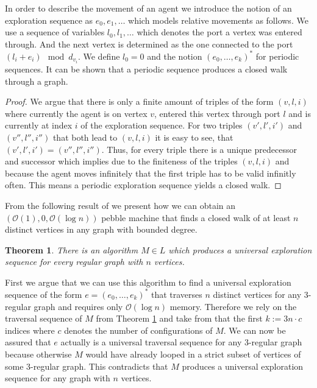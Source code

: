 \documentclass[draft,oneside]{scrartcl}
\newtheorem{thm}{Theorem}
\begin{document}
In order to describe the movement of an agent we introduce the notion of an
exploration sequence as $e_{0}, e_{1},\dots$ which models relative movements
as follows. We use a sequence of variables $l_{0},l_{1},\dots$ which denotes
the port a vertex was entered through. And the next vertex is determined as the
one connected to the port $(l_{i} + e_{i}) \mod d_{v_{i}}$. We define
$l_{0} = 0$ and the notion $(e_{0},\dots,e_{k})^{\ast}$ for periodic sequences.
It can be shown that a periodic sequence produces a closed walk through a
graph.
\begin{proof}
  We argue that there is only a finite amount of triples of the
  form $(v,l,i)$ where currently the agent is on vertex $v$, entered
  this vertex through port $l$ and is currently at index $i$ of the exploration
  sequence. For two triples $(v',l',i')$ and $(v'',l'',i'')$ that both lead to
  $(v,l,i)$ it is easy to see, that $(v',l',i') = (v'',l'',i'')$. Thus, for
  every triple there is a unique predecessor and successor which implies due to
  the finiteness of the triples $(v,l,i)$ and because the agent moves
  infinitely that the first triple has to be valid infinitly often.
  This means a periodic exploration sequence yields a closed walk.
\end{proof}

From the following result of \cite{logspacealg} we present how we can obtain
an $(\mathcal{O}(1),0,\mathcal{O}(\log n))$ pebble machine that finds a closed
walk of at least $n$ distinct vertices in any graph with bounded degree.
\begin{thm}
  \label{thm:logalg}
There is an algorithm $M\in L$ which produces a universal exploration sequence
for every regular graph with $n$ vertices.
\end{thm}
First we argue that we can use this algorithm to find a universal exploration
sequence of the form $e=(e_{0},\dots,e_{k})^{\ast}$ that traverses $n$ distinct
vertices for any 3-regular graph and requires only $\mathcal{O}(\log n)$
memory. Therefore we rely on the traversal sequence of $M$ from Theorem
\ref{thm:logalg} and take from that the first $k:=3n\cdot c$ indices where
$c$ denotes the number of configurations of $M$. We can now be assured that
$e$ actually is a universal traversal sequence for any 3-regular graph because
otherwise $M$ would have already looped in a strict subset of vertices of some
3-regular graph. This contradicts that $M$ produces a universal exploration
sequence for any graph with $n$ vertices.
\end{document}
